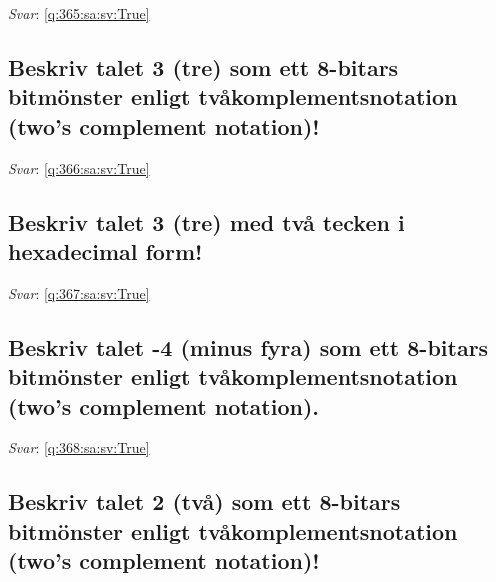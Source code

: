 \documentclass[a4paper,11pt,oneside]{article}
\begin{document}
\begin{sloppypar}
\textit{Svar}: \autoref{q:365:sa:sv:True}



\subsection{Beskriv talet 3 (tre) som ett 8-bitars bitm\"onster enligt tv\r{a}komplementsnotation (two{\textquoteright}s complement notation)!}

\label{q:366:sa:sv:False}

\vspace{2cm}

\noindent\makebox[\textwidth]{\hrulefill}

\vspace{1cm}

\textit{Svar}: \autoref{q:366:sa:sv:True}



\subsection{Beskriv talet 3 (tre) med tv\r{a} tecken i hexadecimal form!}

\label{q:367:sa:sv:False}

\vspace{2cm}

\noindent\makebox[\textwidth]{\hrulefill}

\vspace{1cm}

\textit{Svar}: \autoref{q:367:sa:sv:True}



\subsection{Beskriv talet -4 (minus fyra) som ett 8-bitars bitm\"onster enligt tv\r{a}komplementsnotation (two{\textquoteright}s complement notation).}

\label{q:368:sa:sv:False}

\vspace{2cm}

\noindent\makebox[\textwidth]{\hrulefill}

\vspace{1cm}

\textit{Svar}: \autoref{q:368:sa:sv:True}



\subsection{Beskriv talet 2 (tv\r{a}) som ett 8-bitars bitm\"onster enligt tv\r{a}komplementsnotation (two{\textquoteright}s complement notation)!}


\end{sloppypar}
\end{document}
